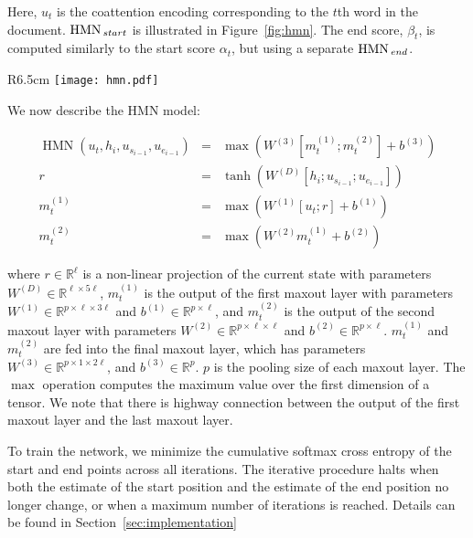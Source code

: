 \documentclass{article} \usepackage{iclr2017_conference,times}
\DeclareMathOperator*{\HMN}{HMN}
\newcommand{\dhid}{\ell}
\newcommand{\real}[1]{\mathbb{R}^{#1}}
\begin{document}
Here, $u_t$ is the coattention encoding corresponding to the $t$th word in the document. $\HMN\hphantom{}_{start}$ is illustrated in Figure~\ref{fig:hmn}.
The end score, $\beta_t$, is computed similarly to the start score $\alpha_t$, but using a separate $\HMN\hphantom{}_{end}$.


\begin{wrapfigure}[19]{R}{6.5cm}
    \centering
	\texttt{[image: hmn.pdf]}
    \vspace{-0.5 cm}
	\caption{Highway Maxout Network. Dotted lines denote highway connections.} 
	\label{fig:hmn}
\end{wrapfigure}

We now describe the HMN model:

\begin{eqnarray}
\HMN \left( u_t, h_i, u_{s_{i-1}}, u_{e_{i-1}} \right) &= &
\max \left( W^{(3)} \left[ m_t^{(1)} ; m_t^{(2)} \right] + b^{(3)} \right)
\\
r &=& \tanh \left(
	W^{(D)} \left[ h_i ; u_{s_{i-1}} ; u_{e_{i-1}} \right]
\right)
\\
m_t^{(1)} &=& \max \left( W^{(1)} \left[ u_t ; r \right] + b^{(1)} \right)
\\
m_t^{(2)} &=& \max \left( W^{(2)} m_t^{(1)} + b^{(2)} \right)
\end{eqnarray}

where $r \in \real{\dhid}$ is a non-linear projection of the current state with parameters
$W^{(D)} \in \real{\dhid \times 5 \dhid}$,
$m_t^{(1)}$ is the output of the first maxout layer with parameters
$W^{(1)} \in \real{p \times \dhid \times 3 \dhid}$ and
$b^{(1)} \in \real{p \times \dhid}$,
and
$m_t^{(2)}$ is the output of the second maxout layer with parameters
$W^{(2)} \in \real{p \times \dhid \times \dhid}$ and
$b^{(2)} \in \real{p \times \dhid}$.
$m_t^{(1)}$ and $m_t^{(2)}$ are fed into the final maxout layer, which has parameters
$W^{(3)} \in \real{p \times 1 \times 2 \dhid}$,
and
$b^{(3)} \in \real{p}$.
$p$ is the pooling size of each maxout layer.
The $\max$ operation computes the maximum value over the first dimension of a tensor.
We note that there is highway connection between the output of the first maxout layer and the last maxout layer.

To train the network, we minimize the cumulative softmax cross entropy of the start and end points across all iterations.
The iterative procedure halts when both the estimate of the start position and the estimate of the end position no longer change, or when a maximum number of iterations is reached.
Details can be found in Section~\ref{sec:implementation}
\end{document}
